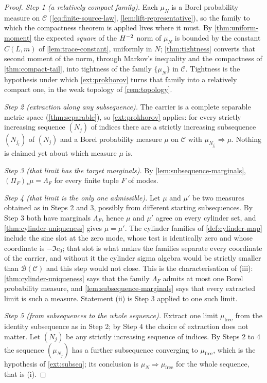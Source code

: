 \begin{proof}
\emph{Step 1 (a relatively compact family).} Each $\mu_N$ is a Borel probability
measure on $\mathcal C$ (\cref{eq:finite-source-law}, \cref{lem:lift-representative}),
so the family to which the compactness theorem is applied lives where it must. By
\cref{thm:uniform-moment} the expected \emph{square} of the $H^{-2}$ norm of
$\mu_N$ is bounded by the constant $C(L,m)$ of
\cref{lem:trace-constant}, uniformly in $N$; \cref{thm:tightness} converts that
second moment of the norm, through Markov's inequality and the compactness of
\cref{thm:compact-tail}, into tightness of the family $\{\mu_N\}$ in $\mathcal C$.
Tightness is the hypothesis under which \cref{ext:prokhorov} turns that family
into a relatively compact one, in the weak topology of \cref{rem:topology}.

\emph{Step 2 (extraction along any subsequence).} The carrier is a complete
separable metric space (\cref{thm:separable}), so \cref{ext:prokhorov} applies:
for every strictly increasing sequence $(N_j)$ of indices there are a strictly
increasing subsequence $(N_{j_l})$ of $(N_j)$ and a Borel probability measure
$\mu$ on $\mathcal C$ with $\mu_{N_{j_l}}\Rightarrow\mu$. Nothing is claimed yet
about which measure $\mu$ is.

\emph{Step 3 (that limit has the target marginals).} By
\cref{lem:subsequence-marginals}, $(\Pi_F)_*\mu=\Lambda_F$ for every finite tuple
$F$ of modes.

\emph{Step 4 (that limit is the only one admissible).} Let $\mu$ and $\mu'$ be
two measures obtained as in Steps 2 and 3, possibly from different starting
subsequences. By Step 3 both have marginals $\Lambda_F$, hence $\mu$ and $\mu'$
agree on every cylinder set, and \cref{thm:cylinder-uniqueness} gives
$\mu=\mu'$. The cylinder families of \cref{def:cylinder-map} include the sine
slot at the zero mode, whose test is identically zero and whose coordinate is
$-\Im c_{0}$; that slot is what makes the families separate every coordinate of
the carrier, and without it the cylinder sigma algebra would be strictly
smaller than $\mathcal B(\mathcal C)$ and this step would not close. This is the
characterisation of (iii):
\cref{thm:cylinder-uniqueness} says that the family $\Lambda_F$ admits at most
one Borel probability measure, and \cref{lem:subsequence-marginals} says that
every extracted limit is such a measure. Statement (ii) is Step 3 applied to one
such limit.

\emph{Step 5 (from subsequences to the whole sequence).} Extract one limit
$\mu_{\mathrm{free}}$ from the identity subsequence as in Step 2; by Step 4 the
choice of extraction does not matter. Let $(N_j)$ be any strictly increasing
sequence of indices. By Steps 2 to 4 the sequence $(\mu_{N_j})$ has a further
subsequence converging to $\mu_{\mathrm{free}}$, which is the hypothesis of
\cref{ext:subseq}; its conclusion is
$\mu_N\Rightarrow\mu_{\mathrm{free}}$ for the whole sequence, that is (i).
\end{proof}

